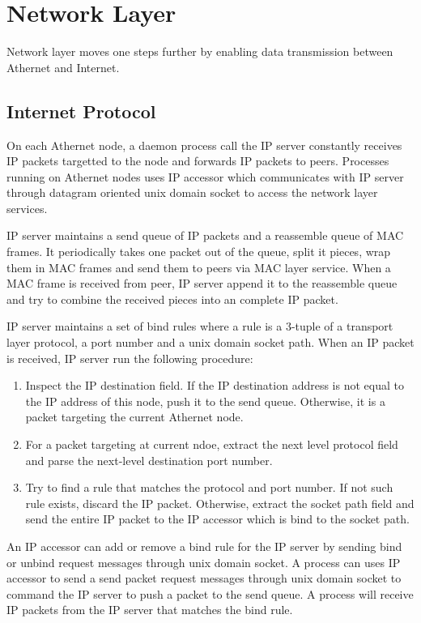 \section{Network Layer}
Network layer moves one steps further by enabling data transmission between Athernet and Internet.

\subsection{Internet Protocol}
On each Athernet node, a daemon process call the IP server constantly receives IP packets targetted to the node and forwards IP packets to peers.
Processes running on Athernet nodes uses IP accessor which communicates with IP server through datagram oriented unix domain socket to access the network layer services.\par


IP server maintains a send queue of IP packets and a reassemble queue of MAC frames.
It periodically takes one packet out of the queue, split it pieces, wrap them in MAC frames and send them to peers via MAC layer service.
When a MAC frame is received from peer, IP server append it to the reassemble queue and try to combine the received pieces into an complete IP packet.\par

IP server maintains a set of bind rules where
a rule is a 3-tuple of a transport layer protocol, a port number and a unix domain socket path.
When an IP packet is received, IP server run the following procedure:
\begin{enumerate}
	\item Inspect the IP destination field.
	      If the IP destination address is not equal to the IP address of this node, push it to the send queue.
	      Otherwise, it is a packet targeting the current Athernet node.
	\item For a packet targeting at current ndoe, extract the next level protocol field and parse the next-level destination port number.
	\item Try to find a rule that matches the protocol and port number.
	      If not such rule exists, discard the IP packet.
		  Otherwise, extract the socket path field and send the entire IP packet to the IP accessor which is bind to the socket path.
\end{enumerate}\par
An IP accessor can add or remove a bind rule for the IP server by sending bind or unbind request messages through unix domain socket.
A process can uses IP accessor to send a send packet request messages through unix domain socket to command the IP server to push a packet to the send queue.
A process will receive IP packets from the IP server that matches the bind rule.


